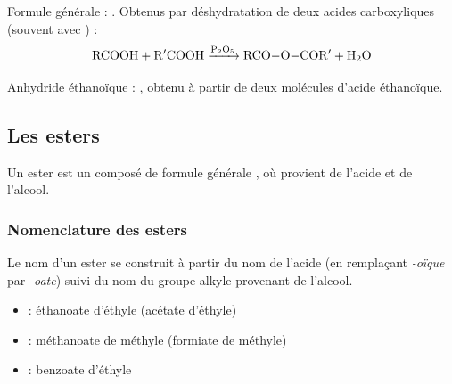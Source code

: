 \begin{propriete}
Formule générale : . Obtenus par déshydratation de deux acides carboxyliques (souvent avec ) :
\[
\ce{RCOOH + R$'$COOH ->[P2O5] RCO-O-COR$'$ + H2O}
\]
\end{propriete}

\begin{exemple}
Anhydride éthanoïque : , obtenu à partir de deux molécules d'acide éthanoïque.
\end{exemple}

\subsection{Les esters}

\begin{definition}[Ester]
Un ester est un composé de formule générale , où  provient de l'acide et  de l'alcool.
\end{definition}

\begin{illustration}
\begin{center}
\end{center}
\end{illustration}

\subsubsection{Nomenclature des esters}

\begin{propriete}
Le nom d'un ester se construit à partir du nom de l'acide (en remplaçant \textit{-oïque} par \textit{-oate}) suivi du nom du groupe alkyle provenant de l'alcool.
\end{propriete}

\begin{exemple}
\begin{itemize}
    \item {} : éthanoate d'éthyle (acétate d'éthyle)
    \item {} : méthanoate de méthyle (formiate de méthyle)
    \item {} : benzoate d'éthyle
\end{itemize}
\end{exemple}

